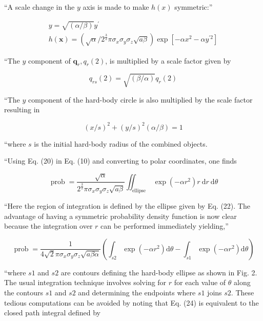 ``A scale change in the $y$ axis is made to make $h(x)$ symmetric:''

\begin{equation}
    \begin{gathered}
        y=\sqrt{(\alpha / \beta)} y^{\prime} \\
        h(\boldsymbol{x})=\left(\sqrt{\alpha} / 2^{\frac{3}{2}} \pi \sigma_{x} \sigma_{y} \sigma_{z} \sqrt{a \beta}\right) \exp \left[-\alpha x^{2}-\alpha y^{\prime 2}\right]
    \end{gathered}
\end{equation}

``The $y$ component of $\boldsymbol{q}_{r}, q_{r}(2)$, is multiplied by a scale factor given by

\begin{equation}
    q_{r s}(2)=\sqrt{(\beta / \alpha)} q_{r}(2)
\end{equation}

``The $y$ component of the hard-body circle is also multiplied by the scale factor resulting in


\begin{equation}
    (x / s)^{2}+(y / s)^{2}(\alpha / \beta)=1
\end{equation}

``where $s$ is the initial hard-body radius of the combined objects.

``Using Eq. (20) in Eq. (10) and converting to polar coordinates, one finds

\begin{equation}
    \operatorname{prob}=\frac{\sqrt{\alpha}}{2^{\frac{3}{2}} \pi \sigma_{x} \sigma_{y} \sigma_{z} \sqrt{a \beta}} \iint_{\text {ellipse }} \exp \left(-\alpha r^{2}\right) r \mathrm{~d} r \mathrm{~d} \theta
\end{equation}

``Here the region of integration is defined by the ellipse given by Eq. (22). The advantage of having a symmetric probability density function is now clear because the integration over $r$ can be performed immediately yielding,''


\begin{equation}
    \operatorname{prob}=\frac{1}{4 \sqrt{2} \pi \sigma_{x} \sigma_{y} \sigma_{z} \sqrt{a \beta \alpha}}\left(\int_{s 2} \exp \left(-\alpha r^{2}\right) \mathrm{d} \theta-\int_{s 1} \exp \left(-\alpha r^{2}\right) \mathrm{d} \theta\right)
\end{equation}

``where $s 1$ and $s 2$ are contours defining the hard-body ellipse as shown in Fig. 2. The usual integration technique involves solving for $r$ for each value of $\theta$ along the contours $s 1$ and $s 2$ and determining the endpoints where $s 1$ joins $s 2$. These tedious computations can be avoided by noting that Eq. (24) is equivalent to the closed path integral defined by

